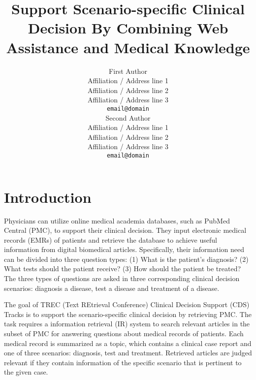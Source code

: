 \documentclass{IEEEtran}
\begin{document}
\title{Support Scenario-specific Clinical Decision By Combining Web Assistance and Medical Knowledge}

\maketitle

\author{First Author \\
  Affiliation / Address line 1 \\
  Affiliation / Address line 2 \\
  Affiliation / Address line 3 \\
  {\tt email@domain} \\\And
  Second Author \\
  Affiliation / Address line 1 \\
  Affiliation / Address line 2 \\
  Affiliation / Address line 3 \\
  {\tt email@domain} \\}


\begin{abstract}

\end{abstract}
\begin{keywords}

\end{keywords}

\section{Introduction}
Physicians can utilize online medical academia databases, such as PubMed Central (PMC), to support their clinical decision. They input electronic medical records (EMRs) of patients and retrieve the database to achieve useful information from digital biomedical articles. Specifically, their information need can be divided into three question types: (1) What is the patient's diagnosis? (2) What tests should the patient receive? (3) How should the patient be treated? The three types of questions are asked in three corresponding clinical decision scenarios: diagnosis a disease, test a disease and treatment of a disease.

The goal of TREC (Text REtrieval Conference) Clinical Decision Support (CDS) Tracks \cite{robertsoverview} is to support the scenario-specific clinical decision by retrieving PMC. The task requires a information retrieval (IR) system to search relevant articles in the subset of PMC for answering questions about medical records of patients. Each medical record is summarized as a topic, which contains a clinical case report and one of three scenarios: diagnosis, test and treatment. Retrieved articles are judged relevant if they contain information of the specific scenario that is pertinent to the given case.
\end{document}
